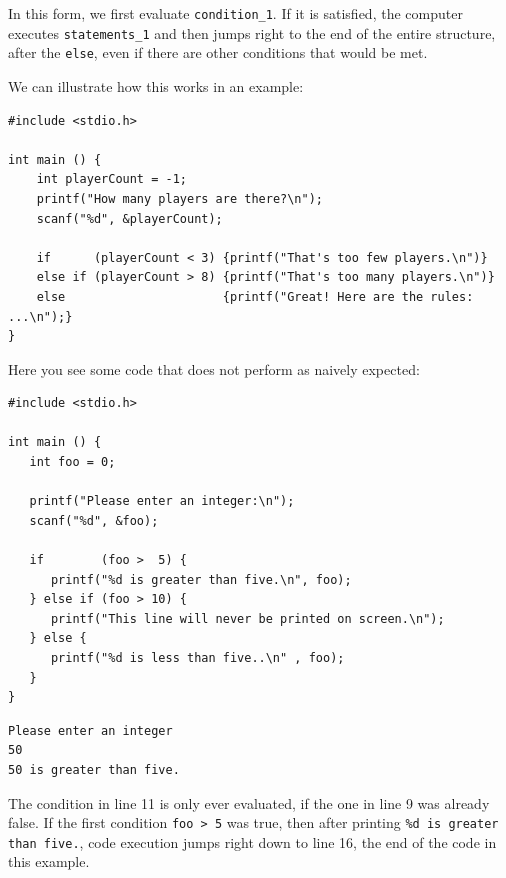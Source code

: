 In this form, we first evaluate \texttt{condition\_1}. If it is satisfied, the computer executes \texttt{statements\_1} and then jumps right to the end of the entire structure, \ie after the \texttt{else}, even if there are other conditions that would be met.

We can illustrate how this works in an example:

\begin{codebox}[ifMultiCase.c]
\begin{verbatim}
#include <stdio.h>

int main () {
    int playerCount = -1;
    printf("How many players are there?\n");
    scanf("%d", &playerCount);

    if      (playerCount < 3) {printf("That's too few players.\n")}
    else if (playerCount > 8) {printf("That's too many players.\n")}
    else                      {printf("Great! Here are the rules: ...\n");}
}
\end{verbatim}
\end{codebox}

Here you see some code that does not perform as naively expected:
\begin{warnbox}[inaccessibleCode.c, leftupper=7mm]
\begin{verbatim}
#include <stdio.h>

int main () {
   int foo = 0;

   printf("Please enter an integer:\n");
   scanf("%d", &foo);

   if        (foo >  5) {
      printf("%d is greater than five.\n", foo);
   } else if (foo > 10) {
      printf("This line will never be printed on screen.\n");
   } else {
      printf("%d is less than five..\n" , foo);
   }
}
\end{verbatim}
\end{warnbox}

\begin{cmdbox}
\begin{verbatim}
Please enter an integer
50
50 is greater than five.
\end{verbatim}
\end{cmdbox}

The condition in line 11 is only ever evaluated, if the one in line 9 was already false. If the first condition \texttt{foo > 5} was true, then after printing \texttt{\%d is greater than five.}, code execution jumps right down to line 16, \ie the end of the code in this example.

